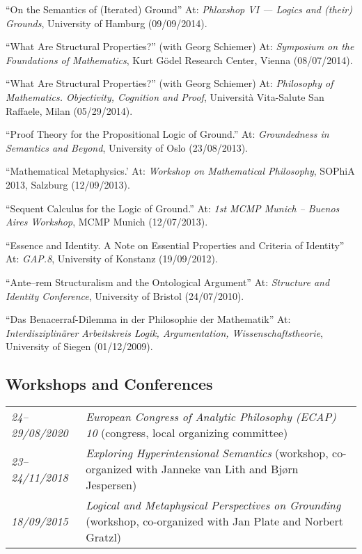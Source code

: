 \begin{etaremune}
  \item ``On the Semantics of (Iterated) Ground'' At: \emph{Phloxshop VI --- Logics and (their) Grounds}, University of Hamburg (09/09/2014).
  \item ``What Are Structural Properties?'' (with Georg Schiemer) At: \emph{Symposium on the Foundations of Mathematics}, Kurt G\"odel Research Center, Vienna (08/07/2014).
  \item ``What Are Structural Properties?'' (with Georg Schiemer) At: \emph{Philosophy of Mathematics. Objectivity, Cognition and Proof}, Universit\`a Vita-Salute San Raffaele, Milan (05/29/2014).
  \item ``Proof Theory for the Propositional Logic of Ground.'' At: \emph{Groundedness in Semantics and Beyond}, University of Oslo (23/08/2013).
  \item ``Mathematical Metaphysics.' At: \emph{Workshop on Mathematical Philosophy}, SOPhiA 2013, Salzburg (12/09/2013).
  \item ``Sequent Calculus for the Logic of Ground.'' At: \emph{1st MCMP Munich -- Buenos Aires Workshop}, MCMP Munich (12/07/2013).
  \item ``Essence and Identity. A Note on Essential Properties and Criteria of Identity'' At: \emph{GAP.8}, University of Konstanz (19/09/2012).
  \item ``Ante--rem Structuralism and the Ontological Argument'' At: \emph{Structure and Identity Conference}, University of Bristol (24/07/2010).
  \item ``Das Benacerraf-Dilemma in der Philosophie der Mathematik'' At: \emph{Interdisziplin\"arer Arbeitskreis Logik, Argumentation, Wissenschaftstheorie}, University of Siegen (01/12/2009).
\end{etaremune}

\subsection*{Workshops and Conferences}
\begin{tabular}{l p{.8\linewidth}}
  \emph{24--29/08/2020} & \emph{European Congress of Analytic Philosophy (ECAP) 10} (congress, local organizing committee)\\[1ex]
  \emph{23--24/11/2018} & \emph{Exploring Hyperintensional Semantics} (workshop, co-organized with Janneke van Lith and Bj{\o}rn Jespersen)\\[1ex]
  \emph{18/09/2015} & \emph{Logical and Metaphysical Perspectives on Grounding} (workshop, co-organized with Jan Plate and Norbert Gratzl)\\
\end{tabular}

